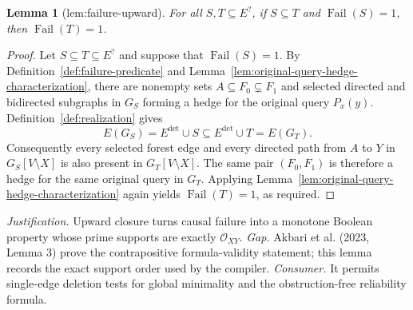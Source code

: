 \documentclass{article}
\newtheorem{lemma}{Lemma}
\begin{document}
\begin{lemma}[lem:failure-upward]\label{lem:failure-upward}
For all \(S,T\subseteq E^{?}\), if \(S\subseteq T\) and \(\operatorname{Fail}(S)=1\), then \(\operatorname{Fail}(T)=1\).
\end{lemma}
\begin{proof}
Let \(S\subseteq T\subseteq E^{?}\) and suppose that \(\operatorname{Fail}(S)=1\).  By Definition~\ref{def:failure-predicate} and Lemma~\ref{lem:original-query-hedge-characterization}, there are nonempty sets \(A\subseteq F_0\subsetneq F_1\) and selected directed and bidirected subgraphs in \(G_S\) forming a hedge for the original query \(P_x(y)\).  Definition~\ref{def:realization} gives
\[
 E(G_S)=E^{\mathrm{det}}\cup S\subseteq E^{\mathrm{det}}\cup T=E(G_T).
\]
Consequently every selected forest edge and every directed path from \(A\) to \(Y\) in \(G_S[V\setminus X]\) is also present in \(G_T[V\setminus X]\).  The same pair \((F_0,F_1)\) is therefore a hedge for the same original query in \(G_T\).  Applying Lemma~\ref{lem:original-query-hedge-characterization} again yields \(\operatorname{Fail}(T)=1\), as required.
\end{proof}
\par\smallskip\noindent \textit{Justification.} Upward closure turns causal failure into a monotone Boolean property whose prime supports are exactly \(\mathcal O_{XY}\). \textit{Gap.} Akbari et al. (2023, Lemma 3) prove the contrapositive formula-validity statement; this lemma records the exact support order used by the compiler. \textit{Consumer.} It permits single-edge deletion tests for global minimality and the obstruction-free reliability formula.
\end{document}
